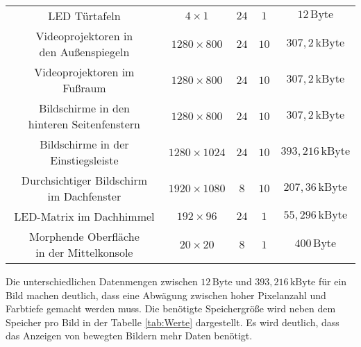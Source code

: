 \begin{table}[hbt]
\begin{tabular}{c|cccc}
		\parbox[t]{0.3\linewidth}{\centering LED Türtafeln} & $ 4 \times 1 $ & $ 24 $ & $ 1 $ &  $ 12\,\mathrm{Byte} $ \\
		\parbox[t]{0.3\linewidth}{\centering Videoprojektoren in\\den Außenspiegeln} & $ 1280 \times 800 $ & $ 24 $ & $ 10 $ &   $ 307,2\,\mathrm{kByte} $ \\ 
		\parbox[t]{0.3\linewidth}{\centering Videoprojektoren im Fußraum} & $ 1280 \times 800 $ & $ 24 $ & $ 10 $ & $ 307,2\,\mathrm{kByte} $ \\
		\parbox[t]{0.3\linewidth}{\centering Bildschirme in den\\hinteren Seitenfenstern} & $ 1280 \times 800 $ & $ 24 $ & $ 10 $ & $ 307,2\,\mathrm{kByte} $ \\
		\parbox[t]{0.3\linewidth}{\centering Bildschirme in der Einstiegsleiste} &  $ 1280 \times 1024 $ & $ 24 $ & $ 10 $ & $ 393,216\,\mathrm{kByte} $ \\
		\parbox[t]{0.3\linewidth}{\centering Durchsichtiger Bildschirm\\im Dachfenster} & $ 1920 \times 1080 $ & $ 8 $ & $ 10 $ & $ 207,36\,\mathrm{kByte} $ \\
		\parbox[t]{0.3\linewidth}{\centering LED-Matrix im Dachhimmel} & $ 192 \times 96 $ & $ 24 $ & $ 1 $ & $ 55,296\,\mathrm{kByte} $ \\
		\parbox[t]{0.3\linewidth}{\centering Morphende Oberfläche\\in der Mittelkonsole} & $ 20 \times 20 $ & $ 8 $ & $ 1 $ & $ 400\,\mathrm{Byte} $ \\
	\end{tabular} 
\end{table}
Die unterschiedlichen Datenmengen zwischen $ 12\,\mathrm{Byte} $ und $ 393,216\,\mathrm{kByte} $ für ein Bild machen deutlich, dass eine Abwägung zwischen hoher Pixelanzahl und Farbtiefe gemacht werden muss. Die benötigte Speichergröße wird neben dem Speicher pro Bild in der Tabelle \ref{tab:Werte} dargestellt. Es wird deutlich, dass das Anzeigen von bewegten Bildern mehr Daten benötigt.
